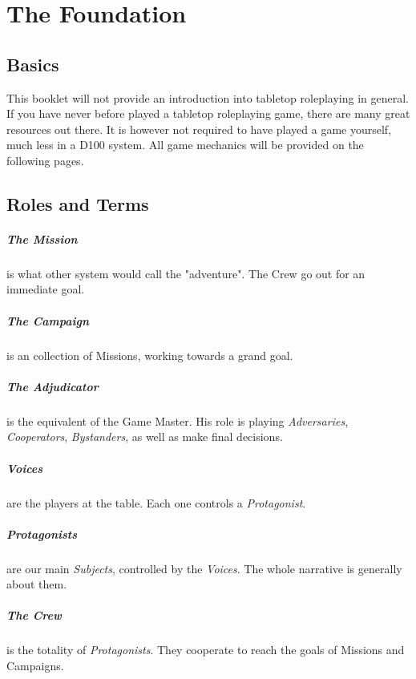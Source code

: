 \documentclass[11pt,a4paper,openany,dvipsnames]{book}
\begin{document}
	

	\chapter{The Foundation}
	\section{Basics}
	This booklet will not provide an introduction into tabletop roleplaying in general. If you have never before played a tabletop roleplaying game, there are many great resources out there. It is however not required to have played a game yourself, much less in a D100 system. All game mechanics will be provided on the following pages.
	\section{Roles and Terms}
	\paragraph{The Mission}
			is what other system would call the "adventure".
		The Crew go out for an immediate goal.
	\paragraph{The Campaign}
			is an collection of Missions, working towards a grand goal.
	
	\paragraph{The Adjudicator}
			is the equivalent of the Game Master.
		His role is playing \emph{Adversaries}, \emph{Cooperators}, \emph{Bystanders}, as well as make final decisions.
	\paragraph{Voices} are the players at the table.
		Each one controls a \emph{Protagonist}.
	
	\paragraph{Protagonists}
			are our main \emph{Subjects}, controlled by the \emph{Voices}.
		The whole narrative is generally about them.
	\paragraph{The Crew}
			is the totality of \emph{Protagonists}.
		They cooperate to reach the goals of Missions and Campaigns.
\end{document}
